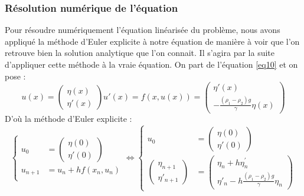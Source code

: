 \documentclass[10pt,a4paper]{article}
\begin{document}
\subsubsection{Résolution numérique de l'équation}

Pour résoudre numériquement l'équation linéarisée du problème, nous avons appliqué la méthode d'Euler explicite \cite{euler} à notre équation de manière à voir que l'on retrouve bien la solution analytique que l'on connait. Il s'agira par la suite d'appliquer cette méthode à la vraie équation. 
\newline\newline
On part de l'équation \ref{eq10} et on pose :
\begin{equation}
u(x)=\begin{pmatrix}
   \eta(x)  \\
   \eta\prime(x)
\end{pmatrix}
u\prime(x) = f(x,u(x)) = \begin{pmatrix}
   \eta\prime(x)  \\
   -\frac{(\rho_{1} - \rho_{2})g}{\gamma}\eta(x)
\end{pmatrix}
\end{equation}
D'où la méthode d'Euler explicite :
\begin{equation}
\begin{cases}
u_{0} &=\begin{pmatrix}
   \eta(0)  \\
   \eta\prime(0)
\end{pmatrix} \\
u_{n+1} &= u_{n} + hf(x_{n},u_{n})\\
\end{cases}
\Longleftrightarrow
\begin{cases}
u_{0} &=\begin{pmatrix}
   \eta(0)  \\
   \eta\prime(0)
\end{pmatrix} \\
\begin{pmatrix}
   \eta_{n+1}  \\
   \eta\prime_{n+1}
\end{pmatrix}  &= \begin{pmatrix}
   \eta_{n} +h \eta^{\prime}_{n}  \\
   \eta\prime_{n} - h \frac{(\rho_{1} - \rho_{2})g}{\gamma}\eta_{n}
\end{pmatrix}
\end{cases}
\end{equation}
\end{document}
